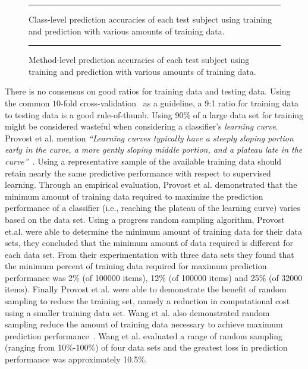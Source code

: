 \begin{figure}[!tb]
  \centering
  \begin{adjustbox}{max size={.95\textwidth}{.90\textheight}}
    
  \end{adjustbox}
  \caption{Class-level prediction accuracies of each test subject using training and prediction with various amounts of training data.}
  \vspace{2mm}
  \hrule
  \label{fig:divisor_class_graph}
\end{figure}

\begin{figure}[!tb]
  \centering
  \begin{adjustbox}{max size={.95\textwidth}{.90\textheight}}
    
  \end{adjustbox}
  \caption{Method-level prediction accuracies of each test subject using training and prediction with various amounts of training data.}
  \vspace{2mm}
  \hrule
  \label{fig:divisor_method_graph}
\end{figure}
\afterpage\clearpage

There is no consensus on good ratios for training data and testing data. Using the common $10$-fold cross-validation~\cite{Koh95} as a guideline, a 9:1 ratio for training data to testing data is a good rule-of-thumb. Using 90\% of a large data set for training might be considered wasteful when considering a classifier's \emph{learning curve}. Provost et al. mention \emph{``Learning curves typically have a steeply sloping portion early in the curve, a more gently sloping middle portion, and a plateau late in the curve''}~\cite{PJO99}. Using a representative sample of the available training data should retain nearly the same predictive performance with respect to supervised learning. Through an empirical evaluation, Provost et al. demonstrated that the minimum amount of training data required to maximize the prediction performance of a classifier (i.e., reaching the plateau of the learning curve) varies based on the data set. Using a progress random sampling algorithm, Provost et.al. were able to determine the minimum amount of training data for their data sets, they concluded that the minimum amount of data required is different for each data set. From their experimentation with three data sets they found that the minimum percent of training data required for maximum prediction performance was 2\% (of 100000 items), 12\% (of 100000 items) and 25\% (of 32000 items). Finally Provost et al. were able to demonstrate the benefit of random sampling to reduce the training set, namely a reduction in computational cost using a smaller training data set. Wang et al. also demonstrated random sampling reduce the amount of training data necessary to achieve maximum prediction performance~\cite{WNC05}. Wang et al. evaluated a range of random sampling (ranging from 10\%-100\%) of four data sets and the greatest loss in prediction performance was approximately 10.5\%. 

